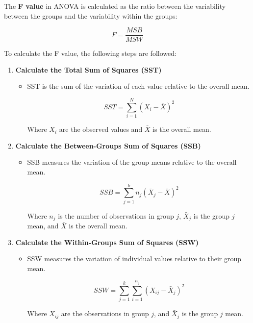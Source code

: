 \documentclass[conference]{IEEEtran}
\begin{document}
    The \textbf{F value} in ANOVA is calculated as the ratio between the variability between the groups and the variability within the groups:
    
    \[
    F = \frac{MSB}{MSW}
    \]
    
    To calculate the F value, the following steps are followed:
    
    \begin{enumerate}
        \item \textbf{Calculate the Total Sum of Squares (SST)}
        \begin{itemize}
            \item SST is the sum of the variation of each value relative to the overall mean.
            
            \[
            SST = \sum_{i=1}^{N} (X_i - \bar{X})^2
            \]
            
            Where \( X_i \) are the observed values and \( \bar{X} \) is the overall mean.
        \end{itemize}
        
        \item \textbf{Calculate the Between-Groups Sum of Squares (SSB)}
        \begin{itemize}
            \item SSB measures the variation of the group means relative to the overall mean.
            
            \[
            SSB = \sum_{j=1}^{k} n_j (\bar{X}_j - \bar{X})^2
            \]
            
            Where \( n_j \) is the number of observations in group \( j \), \( \bar{X}_j \) is the group \( j \) mean, and \( \bar{X} \) is the overall mean.
        \end{itemize}
        
        \item \textbf{Calculate the Within-Groups Sum of Squares (SSW)}
        \begin{itemize}
            \item SSW measures the variation of individual values relative to their group mean.
            
            \[
            SSW = \sum_{j=1}^{k} \sum_{i=1}^{n_j} (X_{ij} - \bar{X}_j)^2
            \]
            
            Where \( X_{ij} \) are the observations in group \( j \), and \( \bar{X}_j \) is the group \( j \) mean.
        \end{itemize}
        

\end{enumerate}
\end{document}
